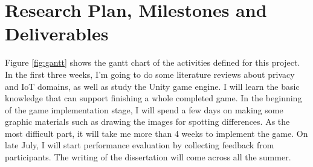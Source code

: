 \documentclass[a4paper,11pt]{article}
\begin{document}






\section{Research Plan, Milestones and Deliverables}


Figure \ref{fig:gantt} shows the gantt chart of the activities defined for this project. In the first three weeks, I'm going to do some literature reviews about privacy and IoT domains, as well as study the Unity game engine. I will learn the basic knowledge that can support finishing a whole completed game. In the beginning of the game implementation stage, I will spend a few days on making some graphic materials such as drawing the images for spotting differences. As the most difficult part, it will take me more than 4 weeks to implement the game. On late July, I will start performance evaluation by collecting feedback from participants. The writing of the dissertation will come across all the summer.

\end{document}

